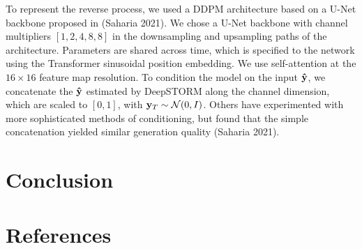 \documentclass{article}
\begin{document}
To represent the reverse process, we used a DDPM architecture based on a U-Net backbone proposed in (Saharia 2021). We chose a U-Net backbone with channel multipliers $[1,2,4,8,8]$ in the downsampling and upsampling paths of the architecture. Parameters are shared across time, which is specified to the network using the Transformer sinusoidal position embedding. We use self-attention at the $16 \times 16$ feature map resolution. To condition the model on the input $\bold{\hat{y}}$, we concatenate the $\bold{\hat{y}}$ estimated by DeepSTORM along the channel dimension, which are scaled to $[0,1]$, with $\bold{y}_T\sim \mathcal{N}(0, I)$. Others have experimented with more sophisticated methods of conditioning, but found that the simple concatenation yielded similar generation quality (Saharia 2021). 


\section{Conclusion}


\clearpage
\section*{References}
\end{document}
